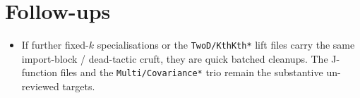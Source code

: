 \documentclass[11pt]{article}
\begin{document}
\section{Follow-ups}
\begin{itemize}[noitemsep]
  \item If further fixed-$k$ specialisations or the \texttt{TwoD/KthKth*} lift files carry the same
    import-block / dead-tactic cruft, they are quick batched cleanups. The J-function files and the
    \texttt{Multi/Covariance*} trio remain the substantive un-reviewed targets.
\end{itemize}
\end{document}

